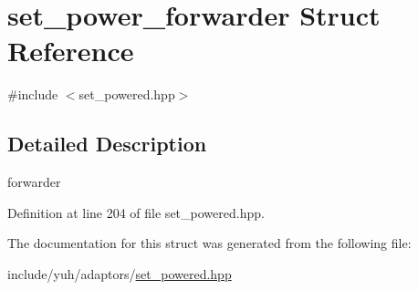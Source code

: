 \hypertarget{structyuh_1_1range__detail_1_1set__power__forwarder}{\section{set\-\_\-power\-\_\-forwarder \-Struct \-Reference}
\label{d4/d42/structyuh_1_1range__detail_1_1set__power__forwarder}
}


{\ttfamily \#include $<$set\-\_\-powered.\-hpp$>$}



\subsection{\-Detailed \-Description}
forwarder 

\-Definition at line 204 of file set\-\_\-powered.\-hpp.



\-The documentation for this struct was generated from the following file\-:\begin{DoxyCompactItemize}
\item 
include/yuh/adaptors/\hyperlink{set__powered_8hpp}{set\-\_\-powered.\-hpp}\end{DoxyCompactItemize}
